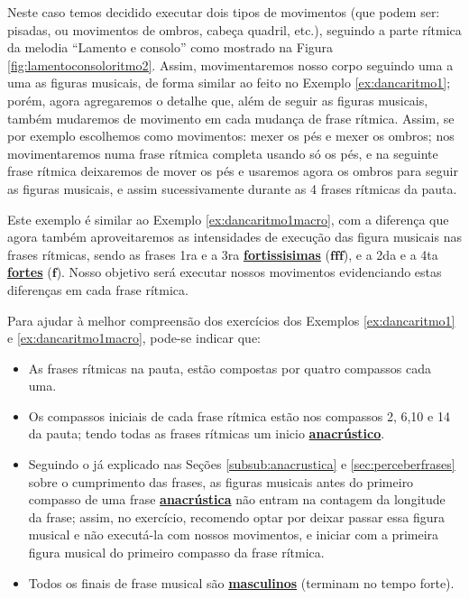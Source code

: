 \begin{example}
\label{ex:dancaritmo1macro}
Neste caso temos decidido executar dois tipos de movimentos 
(que podem ser: pisadas, ou movimentos de ombros, cabeça quadril, etc.),
seguindo a parte rítmica da melodia ``Lamento e consolo'' como mostrado na Figura \ref{fig:lamentoconsoloritmo2}.
Assim, movimentaremos nosso corpo seguindo uma a uma as figuras musicais, 
de forma similar ao feito no Exemplo \ref{ex:dancaritmo1}; porém, 
agora  agregaremos o detalhe que, além de seguir as figuras musicais,
também mudaremos de movimento em cada mudança de frase rítmica.
Assim, se por exemplo escolhemos como movimentos:
mexer os pés e mexer os ombros; nos movimentaremos numa frase rítmica completa usando só os pés,
e na seguinte frase rítmica deixaremos de mover os pés e 
usaremos agora os ombros para seguir as figuras musicais,
e assim sucessivamente durante as 4 frases rítmicas da pauta. 
\end{example}
\begin{example}
\label{ex:dancaritmo2macro}
Este exemplo é similar ao Exemplo \ref{ex:dancaritmo1macro}, 
com a diferença que agora também aproveitaremos as intensidades de execução das figura musicais nas frases rítmicas,
sendo as frases 1ra e a 3ra \hyperref[sec:sinaisintensidade]{\textbf{fortissisimas}} ($\mathbf{fff}$), 
e a 2da e a 4ta \hyperref[sec:sinaisintensidade]{\textbf{fortes}} ($\mathbf{f}$).
Nosso objetivo será executar nossos movimentos evidenciando estas diferenças em cada frase rítmica.
\end{example}
\begin{tcbattention}
Para ajudar à melhor compreensão dos exercícios dos Exemplos \ref{ex:dancaritmo1} e \ref{ex:dancaritmo1macro}, 
pode-se indicar que: 
\begin{itemize}
\item As frases rítmicas na pauta, 
estão compostas  por quatro compassos cada uma.
\item Os compassos iniciais de cada frase rítmica
estão nos compassos 2, 6,10 e 14 da pauta; tendo todas as frases rítmicas um inicio 
\hyperref[subsub:anacrustica]{\textbf{anacrústico}}.
\item Seguindo o já explicado nas Seções \ref{subsub:anacrustica} e \ref{sec:perceberfrases} 
sobre o cumprimento das frases, 
as figuras musicais antes do primeiro compasso de uma frase 
\hyperref[subsub:anacrustica]{\textbf{anacrústica}} não entram na contagem da longitude da frase;
assim, no exercício, recomendo optar por deixar passar essa figura musical e não executá-la com nossos movimentos,
e iniciar com a primeira figura musical do primeiro compasso da frase rítmica.
\item Todos os finais de frase musical são \hyperref[subsec:finaldefrasemus1]{\textbf{masculinos}}
(terminam no tempo forte).
\end{itemize}
\end{tcbattention}

